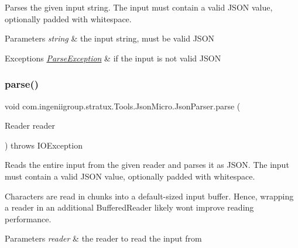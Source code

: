 Parses the given input string. The input must contain a valid J\+S\+ON value, optionally padded with whitespace.


\begin{DoxyParams}{Parameters}
{\em string} & the input string, must be valid J\+S\+ON \\
\hline
\end{DoxyParams}

\begin{DoxyExceptions}{Exceptions}
{\em \hyperlink{classcom_1_1ingeniigroup_1_1stratux_1_1_tools_1_1_json_micro_1_1_parse_exception}{Parse\+Exception}} & if the input is not valid J\+S\+ON \\
\hline
\end{DoxyExceptions}
\mbox{\label{classcom_1_1ingeniigroup_1_1stratux_1_1_tools_1_1_json_micro_1_1_json_parser_a3a957c2de9bf6dc85e55f1a40962f7d8}} 
\subsubsection{\texorpdfstring{parse()}{parse()}\hspace{0.1cm}{\footnotesize\ttfamily [2/3]}}
{\footnotesize\ttfamily void com.\+ingeniigroup.\+stratux.\+Tools.\+Json\+Micro.\+Json\+Parser.\+parse (\begin{DoxyParamCaption}\item[{Reader}]{reader }\end{DoxyParamCaption}) throws I\+O\+Exception}

Reads the entire input from the given reader and parses it as J\+S\+ON. The input must contain a valid J\+S\+ON value, optionally padded with whitespace. 

Characters are read in chunks into a default-\/sized input buffer. Hence, wrapping a reader in an additional {\ttfamily Buffered\+Reader} likely won\textquotesingle{}t improve reading performance. 


\begin{DoxyParams}{Parameters}
{\em reader} & the reader to read the input from \\
\hline
\end{DoxyParams}

